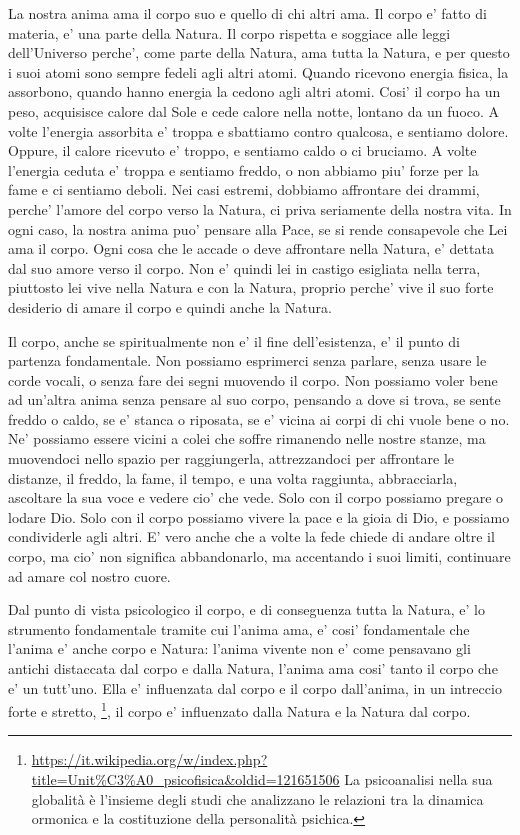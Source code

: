 La nostra anima ama il corpo suo e quello di chi altri ama. Il corpo e' fatto di materia, e' una parte della Natura. Il corpo rispetta e soggiace alle leggi dell'Universo perche', come parte della Natura, ama tutta la Natura, e per questo i suoi atomi sono sempre fedeli agli altri atomi. Quando ricevono energia fisica, la assorbono, quando hanno energia la cedono agli altri atomi.
Cosi' il corpo ha un peso, acquisisce calore dal Sole e cede calore nella notte, lontano da un fuoco. 
A volte l'energia assorbita e' troppa e sbattiamo contro qualcosa, e sentiamo dolore. Oppure, il calore ricevuto e' troppo, e sentiamo caldo o ci bruciamo. A volte l'energia ceduta e' troppa e sentiamo freddo, o non abbiamo piu' forze per la fame e ci sentiamo deboli. Nei casi estremi, dobbiamo affrontare dei drammi, perche' l'amore del corpo verso la Natura, ci priva seriamente della nostra vita. In ogni caso, la nostra anima puo' pensare alla Pace, se si rende consapevole che Lei ama il corpo. Ogni cosa che le accade o deve affrontare nella Natura, e' dettata dal suo amore verso il corpo. Non e' quindi lei in castigo esigliata nella terra, piuttosto lei vive nella Natura e con la Natura, proprio perche' vive il suo forte desiderio di amare il corpo e quindi anche la Natura. 

Il corpo, anche se spiritualmente non e' il fine dell'esistenza, e' il punto di partenza fondamentale. Non possiamo esprimerci senza parlare, senza usare le corde vocali, o senza fare dei segni muovendo il corpo. Non possiamo voler bene ad un'altra anima senza pensare al suo corpo, pensando a dove si trova, se sente freddo o caldo, se e' stanca o riposata, se e' vicina ai corpi di chi vuole bene o no. Ne' possiamo essere vicini a colei che soffre rimanendo nelle nostre stanze, ma muovendoci nello spazio per raggiungerla, attrezzandoci per affrontare le distanze, il freddo, la fame, il tempo, e una volta raggiunta, abbracciarla, ascoltare la sua voce e vedere cio' che vede.
Solo con il corpo possiamo pregare o lodare Dio. Solo con il corpo possiamo vivere la pace e la gioia di Dio, e possiamo condividerle agli altri. E' vero anche che a volte la fede chiede di andare oltre il corpo, ma cio' non significa abbandonarlo, ma accentando i suoi limiti, continuare ad amare col nostro cuore.

Dal punto di vista psicologico il corpo, e di conseguenza tutta la Natura, e' lo strumento fondamentale tramite cui l'anima ama, e' cosi' fondamentale che l'anima e' anche corpo e Natura: l'anima vivente non e' come pensavano gli antichi distaccata dal corpo e dalla Natura, l'anima ama cosi' tanto il corpo che e' un tutt'uno. Ella e' influenzata dal corpo e il corpo dall'anima, in un intreccio forte e stretto, \footnote{
    \url{https://it.wikipedia.org/w/index.php?title=Unit\%C3\%A0\_psicofisica&oldid=121651506}
    La psicoanalisi nella sua globalità è l'insieme degli studi che analizzano le relazioni tra la dinamica ormonica e la costituzione della personalità psichica. 
}, il corpo e' influenzato dalla Natura e la Natura dal corpo.

